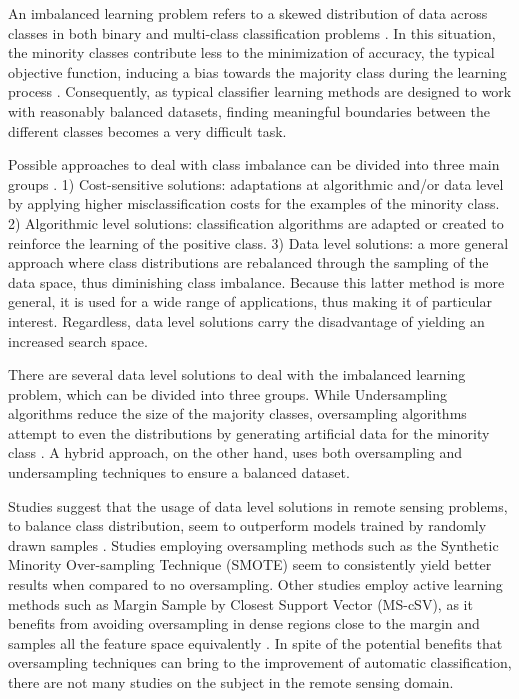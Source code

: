 \documentclass[parskip=full]{scrartcl}
\begin{document}
An imbalanced learning problem refers to a skewed distribution of data across
classes in both binary and multi-class classification problems \cite{Abdi2016}.
In this situation, the minority classes contribute less to the minimization of
accuracy, the typical objective function, inducing a bias towards the majority
class during the learning process \cite{Douzas2019}. Consequently, as typical
classifier learning methods are designed to work with reasonably balanced
datasets, finding meaningful boundaries between the different classes becomes a 
very difficult task\cite{Saez2016}.

Possible approaches to deal with class imbalance can be divided into three main
groups \cite{Fernandez2013}. 1) Cost-sensitive solutions: adaptations at
algorithmic and/or data level by applying higher misclassification costs for the
examples of the minority class. 2) Algorithmic level solutions: classification
algorithms are adapted or created to reinforce the learning of the positive
class. 3) Data level solutions: a more general approach where class
distributions are rebalanced through the sampling of the data space, thus
diminishing class imbalance. Because this latter method is more general, it is
used for a wide range of applications, thus making it of particular interest.
Regardless, data level solutions carry the disadvantage of yielding an increased
search space.

There are several data level solutions to deal with the imbalanced learning
problem, which can be divided into three groups. While Undersampling algorithms
reduce the size of the majority classes, oversampling algorithms attempt to
even the distributions by generating artificial data for the minority class
\cite{Mellor2015}. A hybrid approach, on the other hand, uses both oversampling
and undersampling techniques to ensure a balanced dataset.

Studies suggest that the usage of data level solutions in remote sensing
problems, to balance class distribution, seem to outperform models
trained by randomly drawn samples \cite{Wang2019, Mellor2015}.  Studies
employing oversampling methods such as the Synthetic Minority Over-sampling
Technique (SMOTE) \cite{Chawla2002} seem to consistently yield better results
\cite{Johnson2013, Geib2015} when compared to no oversampling. Other studies 
employ active learning methods such as Margin Sample by Closest Support Vector
(MS-cSV), as it benefits from avoiding oversampling in dense regions close to
the margin and samples all the feature space equivalently \cite{Tuia2009}.
In spite of the potential benefits that oversampling techniques can bring to 
the improvement of automatic classification, there are not many studies on the 
subject in the remote sensing domain.
\end{document}
